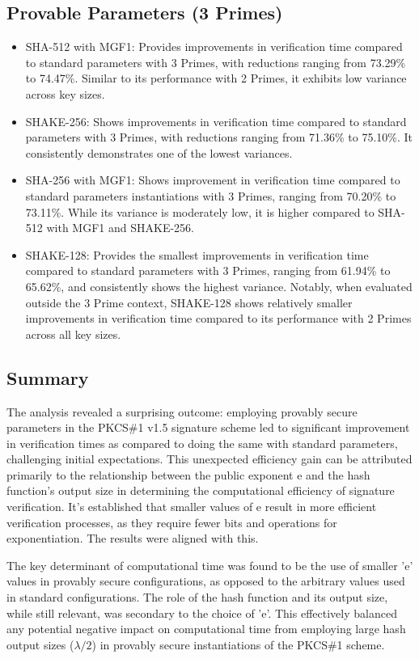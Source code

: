\documentclass[]{final_report}
\theoremstyle{definition}
\begin{document}
\subsection*{Provable Parameters (3 Primes)}
\begin{itemize}
\item SHA-512 with MGF1: Provides improvements in verification time compared to standard parameters with 3 Primes, with reductions ranging from 73.29\% to 74.47\%. Similar to its performance with 2 Primes, it exhibits low variance across key sizes.
\item SHAKE-256: Shows improvements in verification time compared to standard parameters with 3 Primes, with reductions ranging from 71.36\% to 75.10\%. It consistently demonstrates one of the lowest variances.
\item SHA-256 with MGF1: Shows improvement in verification time compared to standard parameters instantiations with 3 Primes, ranging from 70.20\% to 73.11\%. While its variance is moderately low, it is higher compared to SHA-512 with MGF1 and SHAKE-256.
\item SHAKE-128: Provides the smallest improvements in verification time compared to standard parameters with 3 Primes, ranging from 61.94\% to 65.62\%, and consistently shows the highest variance. Notably, when evaluated outside the 3 Prime context, SHAKE-128 shows relatively smaller improvements in verification time compared to its performance with 2 Primes across all key sizes. 
\end{itemize}

\subsection*{Summary}

The analysis revealed a surprising outcome: employing provably secure parameters in the PKCS\#1 v1.5 signature scheme led to significant improvement in verification times as compared to doing the same with standard parameters, challenging initial expectations. This unexpected efficiency gain can be attributed primarily to the relationship between the public exponent e and the hash function's output size in determining the computational efficiency of signature verification. It's established that smaller values of e result in more efficient verification processes, as they require fewer bits and operations for exponentiation. The results were aligned with this.

The key determinant of computational time was found to be the use of smaller 'e' values in provably secure configurations, as opposed to the arbitrary values used in standard configurations. The role of the hash function and its output size, while still relevant, was secondary to the choice of 'e'. This effectively balanced any potential negative impact on computational time from employing large hash output sizes ($\lambda / 2$) in provably secure instantiations of the PKCS\#1 scheme. 
\end{document}
